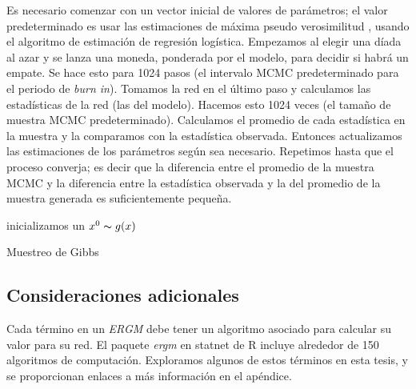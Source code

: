 Es necesario comenzar con un vector inicial de valores de parámetros; el valor predeterminado es usar las estimaciones de máxima pseudo verosimilitud \cite{Besag1974}, usando el algoritmo de estimación de regresión logística. Empezamos al elegir una díada al azar y se lanza una moneda, ponderada por el modelo, para decidir si habrá un empate. Se hace esto para 1024 pasos (el intervalo MCMC predeterminado para el periodo de \textit{burn in}). Tomamos la red en el último paso y calculamos las estadísticas de la red (las del modelo). Hacemos esto 1024 veces (el tamaño de muestra MCMC predeterminado). Calculamos el promedio de cada estadística en la muestra y la comparamos con la estadística observada. Entonces actualizamos las estimaciones de los parámetros según sea necesario. Repetimos hasta que el proceso converja; es decir que la diferencia entre el promedio de la muestra MCMC y la diferencia entre la estadística observada y la del promedio de la muestra generada es suficientemente pequeña.


\begin{algorithm}[H]
\SetLine
{}
inicializamos un $x^{0}\thicksim g(x)$\; \\
\caption{Muestreo de Gibbs}
\end{algorithm}

\subsection{Consideraciones adicionales}

Cada término en un \textit{ERGM} debe tener un algoritmo asociado para calcular su valor para su red. El paquete \textit{ergm} en statnet de R incluye alrededor de 150 algoritmos de computación. Exploramos algunos de estos términos en esta tesis, y se proporcionan enlaces a más información en el apéndice.

